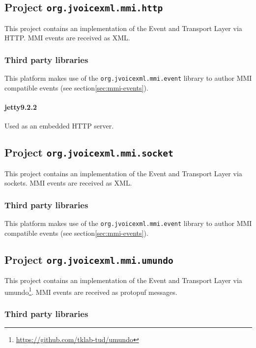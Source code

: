 \documentclass[11pt,a4paper]{article}
\begin{document}
\subsection{Project \texttt{org.jvoicexml.mmi.http}}

This project contains an implementation of the Event and Transport Layer
via HTTP. MMI events are received as XML.

\subsubsection{Third party libraries}

This platform makes use of the \lstinline{org.jvoicexml.mmi.event} library
to author MMI compatible events (see section\ref{sec:mmi-events}).

\paragraph{jetty9.2.2}

Used as an embedded HTTP server.

\subsection{Project \texttt{org.jvoicexml.mmi.socket}}

This project contains an implementation of the Event and Transport Layer
via sockets. MMI events are received as XML.

\subsubsection{Third party libraries}

This platform makes use of the \lstinline{org.jvoicexml.mmi.event} library
to author MMI compatible events (see section\ref{sec:mmi-events}).

\subsection{Project \texttt{org.jvoicexml.mmi.umundo}}

This project contains an implementation of the Event and Transport Layer
via umundo\footnote{\url{https://github.com/tklab-tud/umundo}}.
MMI events are received as protopuf messages.

\subsubsection{Third party libraries}
\end{document}
